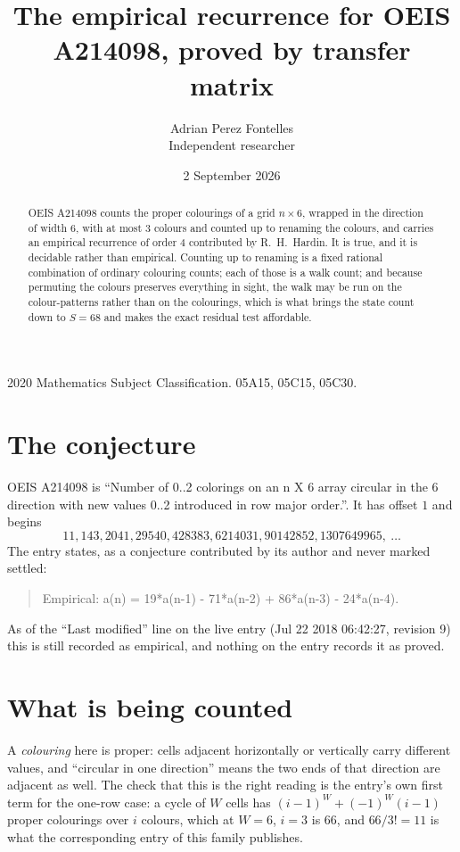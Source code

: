 \documentclass[11pt,a4paper]{article}
\title{The empirical recurrence for OEIS A214098, proved by transfer matrix}
\author{Adrian Perez Fontelles\\ \small Independent researcher}
\date{2 September 2026}
\theoremstyle{plain}
\theoremstyle{definition}
\begin{document}
\maketitle

\begin{abstract}
OEIS A214098 counts the proper colourings of a grid $n\times6$, wrapped in the direction of width $6$, with at most $3$ colours and
counted up to renaming the colours, and carries an empirical recurrence of order $4$
contributed by R.~H.~Hardin. It is true, and it is decidable rather than empirical. Counting
up to renaming is a fixed rational combination of ordinary colouring counts; each of those is
a walk count; and because permuting the colours preserves everything in sight, the walk may be
run on the colour-patterns rather than on the colourings, which is what brings the state count
down to $S=68$ and makes the exact residual test affordable.
\end{abstract}

\noindent\small 2020 Mathematics Subject Classification. 05A15, 05C15, 05C30.\normalsize

\section{The conjecture}

OEIS A214098 is ``Number of 0..2 colorings on an n X 6 array circular in the 6 direction with new values 0..2 introduced in row major order.''. It has offset $1$ and begins
\[
11, 143, 2041, 29540, 428383, 6214031, 90142852, 1307649965,\ \dots
\]
The entry states, as a conjecture contributed by its author and never marked settled:
\begin{quote}
Empirical: a(n) = 19*a(n-1) - 71*a(n-2) + 86*a(n-3) - 24*a(n-4).
\end{quote}
As of the ``Last modified'' line on the live entry (Jul 22 2018 06:42:27, revision 9) this is still
recorded as empirical, and nothing on the entry records it as proved.

\section{What is being counted}

A \emph{colouring} here is proper: cells adjacent horizontally or vertically carry different
values, and ``circular in one direction'' means the two ends of that direction are adjacent as
well. The check that this is the right reading is the entry's own first term for the
one-row case: a cycle of $W$ cells has $(i-1)^W+(-1)^W(i-1)$ proper colourings over $i$
colours, which at $W=6$, $i=3$ is $66$, and $66/3!=11$ is what the corresponding entry of this
family publishes.
\end{document}
